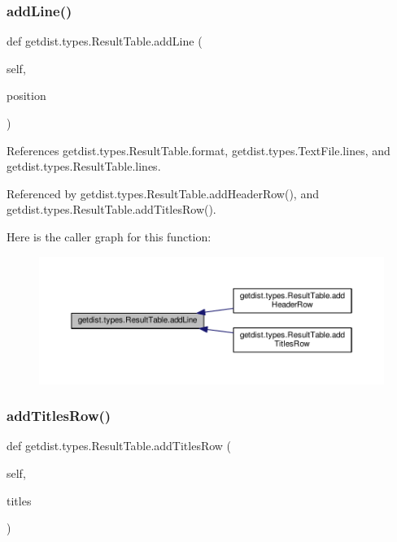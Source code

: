 \subsubsection{\texorpdfstring{add\+Line()}{addLine()}}
{\footnotesize\ttfamily def getdist.\+types.\+Result\+Table.\+add\+Line (\begin{DoxyParamCaption}\item[{}]{self,  }\item[{}]{position }\end{DoxyParamCaption})}



References getdist.\+types.\+Result\+Table.\+format, getdist.\+types.\+Text\+File.\+lines, and getdist.\+types.\+Result\+Table.\+lines.



Referenced by getdist.\+types.\+Result\+Table.\+add\+Header\+Row(), and getdist.\+types.\+Result\+Table.\+add\+Titles\+Row().

Here is the caller graph for this function\+:
\nopagebreak
\begin{figure}[H]
\begin{center}
\leavevmode
\includegraphics[width=350pt]{classgetdist_1_1types_1_1ResultTable_a3f3e2d577f045de380ac50e1f3c21483_icgraph}
\end{center}
\end{figure}
\mbox{\label{classgetdist_1_1types_1_1ResultTable_ae953a90c736afd2c64411202fc8cb08f}} 
\subsubsection{\texorpdfstring{add\+Titles\+Row()}{addTitlesRow()}}
{\footnotesize\ttfamily def getdist.\+types.\+Result\+Table.\+add\+Titles\+Row (\begin{DoxyParamCaption}\item[{}]{self,  }\item[{}]{titles }\end{DoxyParamCaption})}



